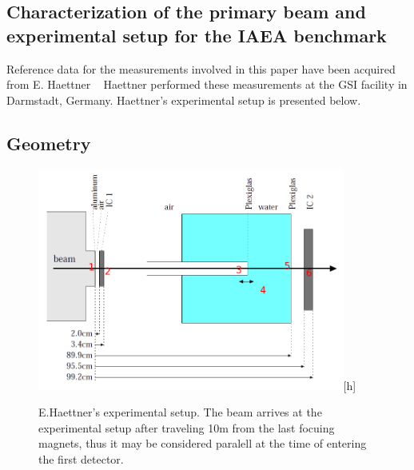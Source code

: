 \subsection{Characterization of the primary beam and experimental setup for the
IAEA benchmark}

Reference data for the measurements involved in this paper have been acquired from E. Haettner ~\cite{ehaettner}  Haettner performed these measurements at the GSI facility in Darmstadt, Germany. Haettner's experimental setup is presented below.

\subsection{Geometry}

\begin{figure}[!h] 
\begin{center}
\includegraphics[width=0.9\textwidth]{images/haetnnersetup2.png}[h]  
\caption{\label{fig:haettnersetup} E.Haettner's experimental setup. The beam arrives at the experimental setup after traveling 10m from the last focuing magnets, thus it may be considered paralell at the time of entering the first detector.}
 \end{center}
 \end{figure}
